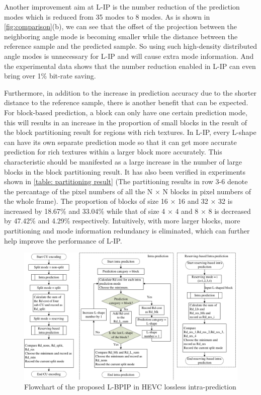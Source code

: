\documentclass[journal]{IEEEtran}
\begin{document}
Another improvement aim at L-IP is the number reduction of the prediction modes which is reduced from 35 modes to 8 modes. As is shown in \autoref{fig:comparison}(b), we can see that the offset of the projection between the neighboring angle mode is becoming smaller while the distance between the reference sample and the predicted sample. So using such high-density distributed angle modes is unnecessary for L-IP and will cause extra mode information. And the experimental data shows that the number reduction enabled in L-IP can even bring over 1\% bit-rate saving.

Furthermore, in addition to the increase in prediction accuracy due to the shorter distance to the reference sample, there is another benefit that can be expected. For block-based prediction, a block can only have one certain prediction mode, this will results in an increase in the proportion of small blocks in the result of the block partitioning result for regions with rich textures. In L-IP, every L-shape can have its own separate prediction mode so that it can get more accurate prediction for rich textures within a larger block more accurately. This characteristic should be manifested as a large increase in the number of large blocks in the block partitioning result. It has also been verified in experiments shown in \autoref{table: partitioning result} (The partitioning results in row 3-6 denote the percantage of the pixel numbers of all the N × N blocks in pixel numbers of the whole frame). The proportion of blocks of size 16 × 16 and 32 × 32 is increased by 18.67\% and 33.04\% while that of size 4 × 4 and 8 × 8 is decreased by 47.42\% and 4.29\% respectively. Intuitively, with more larger blocks, more partitioning and mode information redundancy is eliminated, which can further help improve the performance of L-IP.


\begin{figure}[tp]
    \centering
    \includegraphics[width=18cm]{pictures/flowchart.pdf}
    \caption{Flowchart of the proposed L-BPIP in HEVC lossless intra-prediction}
    \label{fig:flowchart}
\end{figure}
\end{document}
